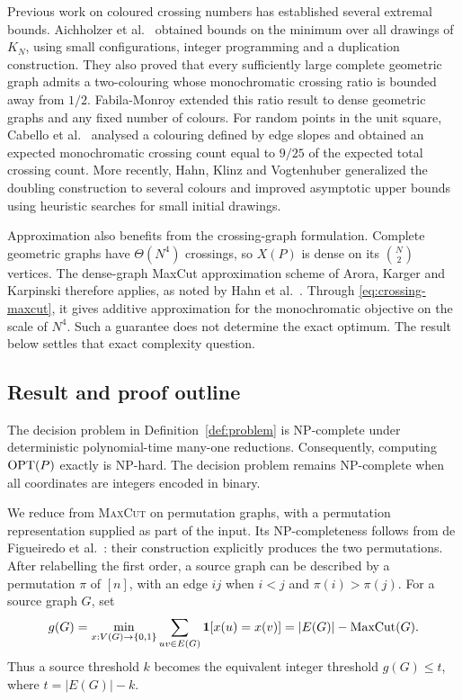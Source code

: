 Previous work on coloured crossing numbers has established several
extremal bounds. Aichholzer et al.\
\cite{Aichholzer2019} obtained bounds on the minimum over all drawings of
$K_N$, using small configurations, integer programming and a duplication
construction. They also proved that every sufficiently large complete
geometric graph admits a two-colouring whose monochromatic crossing
ratio is bounded away from $1/2$. Fabila-Monroy \cite{FabilaMonroy2025}
extended this ratio result to dense geometric graphs and any fixed
number of colours. For random points in the unit square, Cabello et al.\
\cite{Cabello2024} analysed a colouring defined by edge slopes and obtained
an expected monochromatic crossing count equal to $9/25$ of the expected
total crossing count. More recently, Hahn, Klinz and Vogtenhuber
\cite{Hahn2025} generalized the doubling construction to several colours
and improved asymptotic upper bounds using heuristic searches for small
initial drawings.

Approximation also benefits from the crossing-graph formulation.
Complete geometric graphs have $\Theta(N^4)$ crossings, so $X(P)$ is
dense on its $\binom N2$ vertices. The dense-graph MaxCut approximation
scheme of Arora, Karger and Karpinski \cite{Arora1999} therefore applies,
as noted by Hahn et al.\ \cite{Hahn2025}. Through
\eqref{eq:crossing-maxcut}, it gives additive approximation for the
monochromatic objective on the scale of $N^4$. Such a guarantee does not
determine the exact optimum. The result below settles that exact
complexity question.

\subsection{Result and proof outline}

\begin{theorem}\label{thm:main}
The decision problem in Definition~\ref{def:problem} is NP-complete under
deterministic polynomial-time many-one reductions. Consequently, computing
$\operatorname{OPT}(P)$ exactly is NP-hard. The decision problem remains NP-complete
when all coordinates are integers encoded in binary.
\end{theorem}

We reduce from \textsc{MaxCut} on permutation graphs, with a permutation
representation supplied as part of the input. Its NP-completeness follows
from de Figueiredo et al.\ \cite{Figueiredo2023}: their construction
explicitly produces the two permutations. After relabelling the first
order, a source graph can be described by a permutation $\pi$ of $[n]$,
with an edge $ij$ when $i<j$ and $\pi(i)>\pi(j)$.
For a source graph $G$, set
\[
 g(G)=\min_{x:V(G)\to\{0,1\}}
          \sum_{uv\in E(G)}\mathbf 1[x(u)=x(v)]
      =|E(G)|-\operatorname{MaxCut}(G).
\]
Thus a source threshold $k$ becomes the equivalent integer threshold
$g(G)\leq t$, where $t=|E(G)|-k$.

